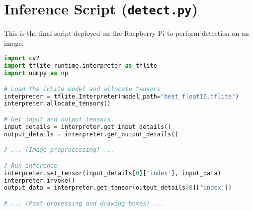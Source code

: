\section{Inference Script (\texttt{detect.py})}
This is the final script deployed on the Raspberry Pi to perform detection on an image.
\begin{lstlisting}[language=Python, caption={Key snippet from the Raspberry Pi inference script.}]
import cv2
import tflite_runtime.interpreter as tflite
import numpy as np

# Load the TFLite model and allocate tensors
interpreter = tflite.Interpreter(model_path="best_float16.tflite")
interpreter.allocate_tensors()

# Get input and output tensors.
input_details = interpreter.get_input_details()
output_details = interpreter.get_output_details()

# ... (Image preprocessing) ...

# Run inference
interpreter.set_tensor(input_details[0]['index'], input_data)
interpreter.invoke()
output_data = interpreter.get_tensor(output_details[0]['index'])

# ... (Post-processing and drawing boxes) ...
\end{lstlisting}
